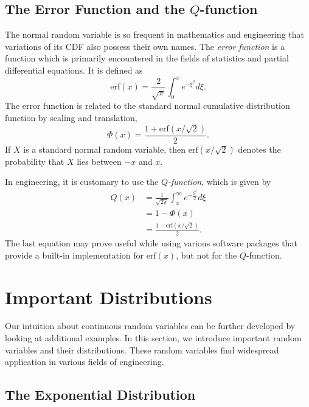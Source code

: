 \subsection{The Error Function and the $Q$-function}

The normal random variable is so frequent in mathematics and engineering that variations of its CDF also possess their own names.
The \emph{error function} is a function which is primarily encountered in the fields of statistics and partial differential equations.
It is defined as
\begin{equation*}
\mathrm{erf} (x) = \frac{2}{\sqrt{\pi}} \int_0^x e^{-\xi^2} d\xi .
\end{equation*}
The error function is related to the standard normal cumulative distribution function by scaling and translation,
\begin{equation*}
\Phi (x) = \frac{1 + \mathrm{erf} \left( {x}/{\sqrt{2}} \right)}{2}.
\end{equation*}
If $X$ is a standard normal random variable, then $\mathrm{erf} \left( x/{\sqrt{2}} \right)$ denotes the probability that $X$ lies between $-x$ and $x$.

In engineering, it is customary to use the \emph{$Q$-function}, which is given by
\begin{equation*}
\begin{split}
Q (x) &= \frac{1}{\sqrt{2 \pi}} \int_x^{\infty} e^{-\frac{\xi^2}{2}} d\xi \\
&= 1 - \Phi (x) \\
&= \frac{ 1 - \mathrm{erf} \left( {x}/{\sqrt{2}} \right) }{2} .
\end{split}
\end{equation*}
The last equation may prove useful while using various software packages that provide a built-in implementation for $\mathrm{erf}(x)$, but not for the $Q$-function.


\section{Important Distributions}

Our intuition about continuous random variables can be further developed by looking at additional examples.
In this section, we introduce important random variables and their distributions.
These random variables find widespread application in various fields of engineering.


\subsection{The Exponential Distribution}

